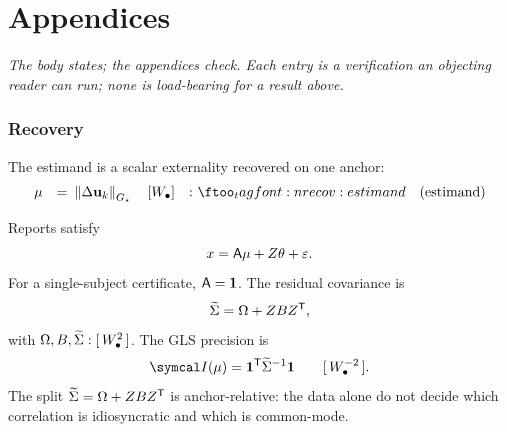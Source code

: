 \documentclass[../main]{subfiles}
\begin{document}
\clearpage
\part*{Appendices}
\appendix

\begin{center}\itshape
  The body states; the appendices check. Each entry is a verification an objecting reader
  can run; none is load-bearing for a result above.
\end{center}
\bigskip

\section{Recovery}
\label{app:recovery}

The estimand is a scalar externality recovered on one anchor:
\begin{align}
  &\recoveryfact &=& \ \normG{\outcomechange{k}}
    \quad \dimwelfare
    &:& \eqtag{recov:estimand}{estimand}
\end{align}

\begin{remark}
  Reports satisfy
  \begin{equation}
    x=\mathsf{A}\mu+Z\theta+\varepsilon.
    \label{eq:recov:reports}
  \end{equation}
  For a single-subject certificate, $\mathsf{A}=\mathbf 1$. The residual covariance is
  \begin{equation}
    \widetilde{\Sigma}=\Omega+ZBZ\sp{\mathsf{T}},
    \label{eq:recov:covsplit}
  \end{equation}
  with $\Omega,B,\widetilde{\Sigma}:[\,W\sb{\bullet}\sp{2}\,]$. The GLS precision is
  \begin{equation}
    \precisionof{\recoveryfact}=\mathbf 1\transpose\reportcov\sp{-1}\mathbf 1
    \qquad \dimpublicwelfareinvsq.
    \label{eq:recov:gls}
  \end{equation}
  The split $\widetilde{\Sigma}=\Omega+ZBZ\sp{\mathsf{T}}$ is
  anchor-relative: the data alone do not decide which correlation is idiosyncratic and which
  is common-mode.
\end{remark}
\end{document}
